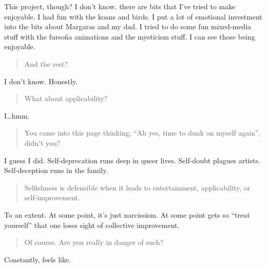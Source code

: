 This project, though? I don't know. there are bits that I've tried to make enjoyable. I had fun with the koans and birds. I put a lot of emotional investment into the bits about Margaras and my dad. I tried to do some fun mixed-media stuff with the fursoña animations and the mysticism stuff. I can see those being enjoyable.

\begin{quote}
And the rest?
\end{quote}

I don't know. Honestly.

\begin{quote}
What about applicability?
\end{quote}

I\ldots{}hmm.

\begin{quote}
You came into this page thinking, ``Ah yes, time to dunk on myself again'', didn't you?
\end{quote}

I guess I did. Self-deprecation runs deep in queer lives. Self-doubt plagues artists. Self-deception runs in the family.

\begin{quote}
Selfishness is defensible when it leads to entertainment, applicability, or self-improvement.
\end{quote}

To an extent. At some point, it's just narcissism. At some point gets so ``treat yourself'' that one loses sight of collective improvement.

\begin{quote}
Of course. Are you really in danger of such?
\end{quote}

Constantly, feels like.
